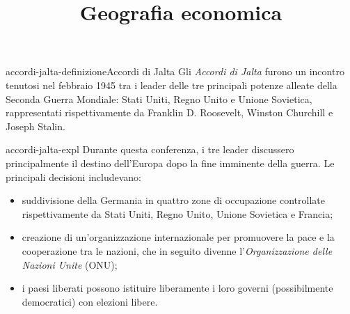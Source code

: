 \documentclass[preview]{standalone}
\begin{document}
\title{Geografia economica}
\genpage

\begin{snippetdefinition}{accordi-jalta-definizione}{Accordi di Jalta}
    Gli \textit{Accordi di Jalta} furono un incontro tenutosi nel febbraio 1945 tra i leader delle tre principali potenze alleate della Seconda Guerra Mondiale: Stati Uniti, Regno Unito e Unione Sovietica, rappresentati rispettivamente da Franklin D. Roosevelt, Winston Churchill e Joseph Stalin.
\end{snippetdefinition}

\begin{snippet}{accordi-jalta-expl}
    Durante questa conferenza, i tre leader discussero principalmente il destino dell'Europa dopo la fine imminente della guerra. Le principali decisioni includevano:

    \begin{itemize}
        \item suddivisione della Germania in quattro zone di occupazione controllate rispettivamente
            da Stati Uniti, Regno Unito, Unione Sovietica e Francia;
        \item creazione di un'organizzazione internazionale per promuovere la pace e la cooperazione tra le nazioni, che in seguito divenne l'\textit{Organizzazione delle Nazioni Unite} (ONU);
        \item i paesi liberati possono istituire liberamente i loro governi (possibilmente democratici) con elezioni libere.
    \end{itemize}
\end{snippet}
\end{document}
